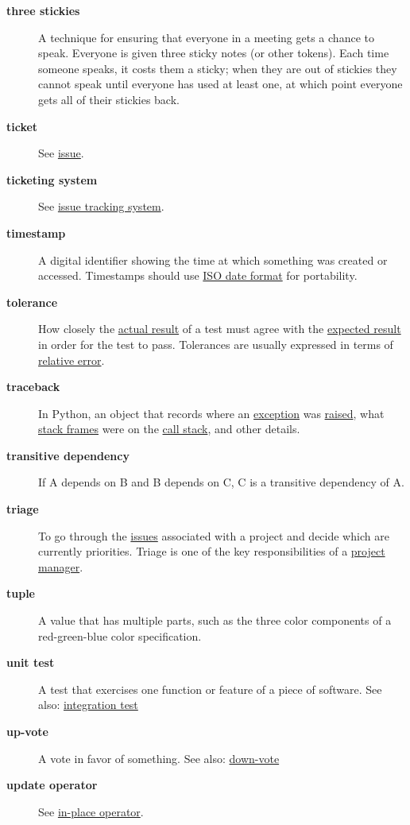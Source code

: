 \documentclass[
]{krantz}
\begin{document}
\begin{description}
\item[\textbf{three stickies}]
A technique for ensuring that everyone in a meeting gets a chance to speak. Everyone is given three sticky notes (or other tokens). Each time someone speaks, it costs them a sticky; when they are out of stickies they cannot speak until everyone has used at least one, at which point everyone gets all of their stickies back.
\item[\textbf{ticket}]
See \protect\hyperlink{issue}{issue}.
\item[\textbf{ticketing system}]
See \protect\hyperlink{issue_tracking_system}{issue tracking system}.
\item[\textbf{timestamp}]
A digital identifier showing the time at which something was created or accessed. Timestamps should use \protect\hyperlink{iso_date_format}{ISO date format} for portability.
\item[\textbf{tolerance}]
How closely the \protect\hyperlink{actual_result}{actual result} of a test must agree with the \protect\hyperlink{expected_result}{expected result} in order for the test to pass. Tolerances are usually expressed in terms of \protect\hyperlink{relative_error}{relative error}.
\item[\textbf{traceback}]
In Python, an object that records where an \protect\hyperlink{exception}{exception} was \protect\hyperlink{raise_exception}{raised}, what \protect\hyperlink{stack_frame}{stack frames} were on the \protect\hyperlink{call_stack}{call stack}, and other details.
\item[\textbf{transitive dependency}]
If A depends on B and B depends on C, C is a transitive dependency of A.
\item[\textbf{triage}]
To go through the \protect\hyperlink{issue}{issues} associated with a project and decide which are currently priorities. Triage is one of the key responsibilities of a \protect\hyperlink{project_manager}{project manager}.
\item[\textbf{tuple}]
A value that has multiple parts, such as the three color components of a red-green-blue color specification.
\item[\textbf{unit test}]
A test that exercises one function or feature of a piece of software. See also: \protect\hyperlink{integration_test}{integration test}
\item[\textbf{up-vote}]
A vote in favor of something. See also: \protect\hyperlink{down_vote}{down-vote}
\item[\textbf{update operator}]
See \protect\hyperlink{in_place_operator}{in-place operator}.

\end{description}
\end{document}
